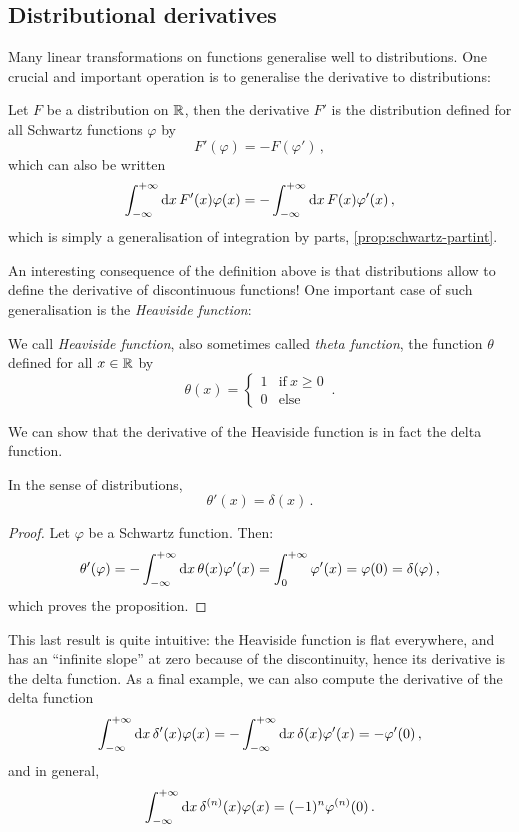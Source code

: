 \subsection{Distributional derivatives}
Many linear transformations on functions generalise well to distributions. One crucial
and important operation is to generalise the derivative to distributions:
\begin{definition}
	Let $F$ be a distribution on $\mathbb{R}$, then the derivative $F'$ is the distribution defined
	for all Schwartz functions $\varphi$ by
	\begin{equation}
		F'(\varphi)=-F(\varphi')\,,
	\end{equation}
	which can also be written
	\begin{equation}
		\int_{-\infty}^{+\infty}\mathrm{d}{x}\,F'(x)\varphi(x)=-\int_{-\infty}^{+\infty}\mathrm{d}{x}\,F(x)\varphi'(x)\,,
	\end{equation}
	which is simply a generalisation of integration by parts,
	\cf\cref{prop:schwartz-partint}.
\end{definition}
An interesting consequence of the definition above is that distributions allow to define
the derivative of discontinuous functions! One important case of such generalisation is
the \emph{Heaviside function}:
\begin{definition}
	We call \emph{Heaviside function}, also sometimes called \emph{theta function}, the
	function $\theta$ defined for all $x\in\mathbb{R}$ by
	\begin{equation}
		\theta(x)=
		\begin{cases}
			1 & \text{if}~x\geq 0 \\
			0 & \text{else}
		\end{cases}\,.
	\end{equation}
\end{definition}
We can show that the derivative of the Heaviside function is in fact the delta function.
\begin{proposition}
	In the sense of distributions,
	\begin{equation}
		\theta'(x)=\delta(x)\,.
	\end{equation}
\end{proposition}
\begin{proof}
	Let $\varphi$ be a Schwartz function. Then:
	\begin{equation}
		\theta'(\varphi)=-\int_{-\infty}^{+\infty}\mathrm{d}{x}\,\theta(x)\varphi'(x)=\int_0^{+\infty}\varphi'(x)
		=\varphi(0)=\delta(\varphi)\,,
	\end{equation}
	which proves the proposition.
\end{proof}
This last result is quite intuitive: the Heaviside function is flat everywhere, and has an
``infinite slope'' at zero because of the discontinuity, hence its derivative is the delta
function. As a final example, we can also compute the derivative of the delta function
\begin{equation}
	\int_{-\infty}^{+\infty}\mathrm{d}{x}\,\delta'(x)\varphi(x)=-\int_{-\infty}^{+\infty}\mathrm{d}{x}\,\delta(x)\varphi'(x)=-\varphi'(0)\,,
\end{equation}
and in general,
\begin{equation}
	\int_{-\infty}^{+\infty}\mathrm{d}{x}\,\delta^{(n)}(x)\varphi(x)=(-1)^n\varphi^{(n)}(0)\,.
\end{equation}
